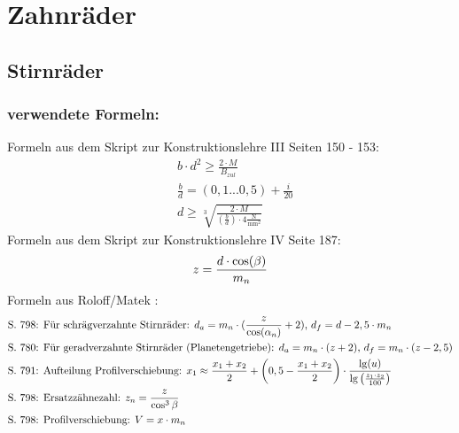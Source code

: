 \section{Zahnräder}
\subsection{Stirnräder}
\subsubsection{verwendete Formeln:}
Formeln aus dem Skript zur Konstruktionslehre III Seiten 150 - 153:
\begin{align*}
	&b \cdot d^2 \ge\frac{2 \cdot M}{B_{zul}} \\
	&\frac{b}{d} = (0,1...0,5) + \frac{i}{20} \\
	&d \ge \sqrt[3]{\frac{2 \cdot M}{( \frac{b}{d}) \cdot  4 \frac{\text{N}}{\text{mm}^2}}}
\end{align*}
Formeln aus dem Skript zur Konstruktionslehre IV Seite 187:
\begin{align*}
	&z= \frac{d \cdot \cos(\beta)}{m_n} \\
\end{align*}
Formeln aus Roloff/Matek :
\begin{align*}
	&\text{S. 798: Für schrägverzahnte Stirnräder: }d_a = m_n \cdot (\frac{z}{\cos(\alpha_n)}+2)\text{, } d_f =d- 2,5 \cdot m_n\\
	&\text{S. 780: Für geradverzahnte Stirnräder (Planetengetriebe): } d_a = m_n \cdot (z + 2) \text{, } d_f = m_n \cdot (z-2,5) \\
	&\text{S. 791: Aufteilung Profilverschiebung: } x_1 \approx \frac{x_1 + x_2}{2} + \left( 0,5 - \frac{x_1+x_2}{2} \right) \cdot \frac{\lg(u)}{\lg\left( \frac{z_1 \cdot z_2}{100} \right)} \\
	&\text{S. 798: Ersatzzähnezahl: } z_n = \frac{z}{\cos^3\beta} \\
	&\text{S. 798: Profilverschiebung: } V = x \cdot m_n 
\end{align*}
